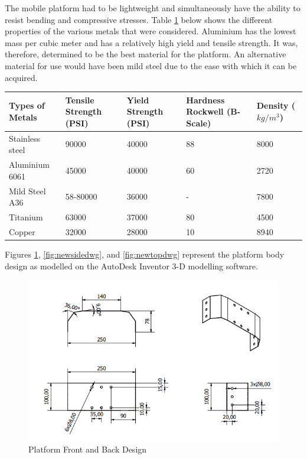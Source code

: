 The mobile platform had to be lightweight and simultaneously have the ability to resist bending and compressive stresses. Table \ref{table:materialproperties} below shows the different properties of the various metals that were considered. Aluminium has the lowest mass per cubic meter and has a relatively high yield and tensile strength. It was, therefore, determined to be the best material for the platform. An alternative material for use would have been mild steel due to the ease with which it can be acquired.


\begin{table}[H]
  \begin{center}
      \leavevmode
     \begin{tabular}{| m{3cm} | m{2cm} | m{2cm} | m{2cm} | m{3cm} |}\hline
      Types of Metals & Tensile Strength (PSI) & Yield Strength (PSI) & Hardness Rockwell (B-Scale) & Density (\(kg/m^3\)) \\
      \hline
         Stainless steel   & 90000    & 40000 & 88 & 8000\\
         \hline
         Aluminium 6061 & 45000 & 40000 & 60 & 2720\\
         \hline
         Mild Steel A36   & 58-80000 & 36000  & - & 7800  \\
         \hline
         Titanium & 63000 & 37000 & 80 & 4500 \\
         \hline
         Copper & 32000 & 28000 & 10 & 8940 \\
    \hline
    \end{tabular}

    \label{table:materialproperties}
  \end{center}
\end{table}

Figures \ref{fig:newfrontdwg}, \ref{fig:newsidedwg}, and \ref{fig:newtopdwg} represent the platform body design as modelled on the AutoDesk Inventor 3-D modelling software.

\begin{figure}[H]
    \centering
    \includegraphics[scale = 0.9]{Figures/NewFrontDWG.png}
    \caption{Platform Front and Back Design}
    \label{fig:newfrontdwg}
\end{figure}

